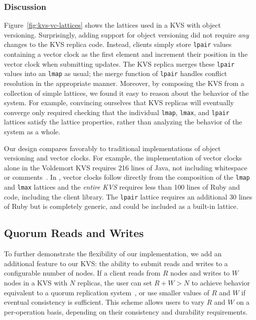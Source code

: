 \subsubsection{Discussion}
Figure~\ref{fig:kvs-vc-lattices} shows the lattices used in a KVS with object
versioning. Surprisingly, adding support for object versioning did not require
\emph{any} changes to the KVS replica code. Instead, clients simply store
\texttt{lpair} values containing a vector clock as the first element and
increment their position in the vector clock when submitting updates. The KVS
replica merges these \texttt{lpair} values into an \texttt{lmap} as usual; the
merge function of \texttt{lpair} handles conflict resolution in the appropriate
manner. Moreover, by composing the KVS from a collection of simple lattices, we
found it easy to reason about the behavior of the system. For example,
convincing ourselves that KVS replicas will eventually converge only required
checking that the individual \texttt{lmap}, \texttt{lmax}, and \texttt{lpair}
lattices satisfy the lattice properties, rather than analyzing the behavior of
the system as a whole.

Our design compares favorably to traditional implementations of object
versioning and vector clocks. For example, the implementation of vector clocks
alone in the Voldemort KVS requires 216 lines of Java, not including whitespace
or comments~\cite{voldemort-vector-clock}. In \lang, vector clocks follow
directly from the composition of the \texttt{lmap} and \texttt{lmax} lattices
and the \emph{entire KVS} requires less than 100 lines of Ruby and \lang code,
including the client library. The \texttt{lpair} lattice requires an additional
30 lines of Ruby but is completely generic, and could be included as a built-in
lattice.

\subsection{Quorum Reads and Writes}
To further demonstrate the flexibility of our implementation, we add an
additional feature to our KVS: the ability to submit reads and writes to a
configurable number of nodes. If a client reads from $R$ nodes and writes to $W$
nodes in a KVS with $N$ replicas, the user can set $R + W > N$ to achieve
behavior equivalent to a quorum replication system~\cite{Gifford1979}, or use
smaller values of $R$ and $W$ if eventual consistency is sufficient. This scheme
allows users to vary $R$ and $W$ on a per-operation basis, depending on their
consistency and durability requirements.

